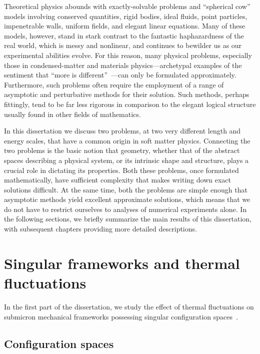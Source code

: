 Theoretical physics abounds with exactly-solvable problems and ``spherical cow'' models involving conserved quantities, rigid bodies, ideal fluids, point particles, impenetrable walls, uniform fields, and elegant linear equations.
Many of these models, however, stand in stark contrast to the fantastic haphazardness of the real world, which is messy and nonlinear, and continues to bewilder us as our experimental abilities evolve.
For this reason, many physical problems, especially those in condensed-matter and materials physics---archetypal examples of the sentiment that ``more is different''~\cite{anderson1972}---can only be formulated approximately.
Furthermore, such problems often require the employment of a range of asymptotic and perturbative methods for their solution.
Such methods, perhaps fittingly, tend to be far less rigorous in comparison to the elegant logical structure usually found in other fields of mathematics.

In this dissertation we discuss two problems, at two very different length and energy scales, that have a common origin in soft matter physics.  Connecting the two problems is the basic notion that geometry, whether that of the abstract spaces describing a physical system, or its intrinsic shape and structure, plays a crucial role in dictating its properties.  Both these problems, once formulated mathematically, have sufficient complexity that makes writing down exact solutions difficult.  At the same time, both the problems are simple enough that asymptotic methods yield excellent approximate solutions, which means that we do not have to restrict ourselves to analyses of numerical experiments alone.  In the following sections, we briefly summarize the main results of this dissertation, with subsequent chapters providing more detailed descriptions.

\section{Singular frameworks and thermal fluctuations}

In the first part of the dissertation, we study the effect of thermal fluctuations on submicron mechanical frameworks possessing singular configuration spaces~\cite{mannattil2022}.

\subsection{Configuration spaces}

